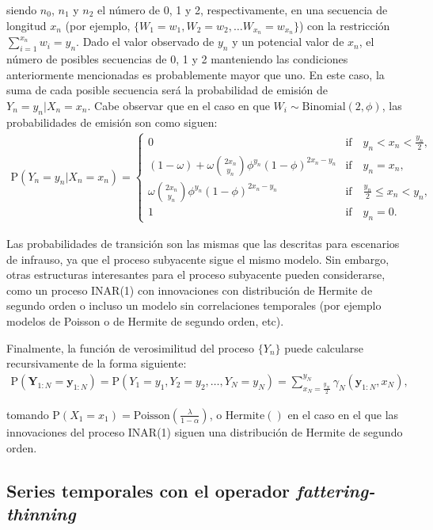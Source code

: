 \documentclass[12pt,twoside]{article} %
\begin{document}
\noindent siendo $n_0$, $n_1$ y $n_2$ el número de 0, 1 y 2, respectivamente, en una secuencia de longitud $x_n$ (por ejemplo, $\{W_1=w_1, W_2=w_2, \dots W_{x_n}=w_{x_n}\}$) con la restricción $\sum_{i=1}^{x_n}w_i=y_n$. Dado el valor observado de $y_n$ y un potencial valor de $x_n$, el número de posibles secuencias de 0, 1 y 2 manteniendo las condiciones anteriormente mencionadas es probablemente mayor que uno. En este caso, la suma de cada posible secuencia será la probabilidad de emisión de $Y_n=y_n|X_n=x_n$. Cabe observar que en el caso en que $W_i \sim \textrm{Binomial}(2,\phi)$, las probabilidades de emisión son como siguen:
 \begin{align}
\textrm{P}(Y_n=y_n|X_n=x_n)=\begin{cases} 
0 &  \textrm{if} \quad y_n<x_n<\frac{y_n}{2} , \\
(1-\omega)+\omega \binom{2x_n}{y_n}\phi^{y_n}(1-\phi)^{2x_n-y_n}&  \textrm{if} \quad y_n=x_n , \\
\omega \binom{2x_n}{y_n}\phi^{y_n}(1-\phi)^{2x_n-y_n} &  \textrm{if} \quad  \frac{y_n}{2}\leq x_n <y_n, \\
1 & \textrm{if} \quad  y_n=0.
\end{cases}
\end{align}

\noindent Las probabilidades de transición son las mismas que las descritas para escenarios de infrauso, ya que el proceso subyacente sigue el mismo modelo. Sin embargo, otras estructuras interesantes para el proceso subyacente pueden considerarse, como un proceso INAR(1) con innovaciones con distribución de Hermite de segundo orden o incluso un modelo sin correlaciones temporales (por ejemplo modelos de Poisson o de Hermite de segundo orden, etc).

\noindent Finalmente, la función de verosimilitud del proceso $\{Y_n\}$ puede calcularse recursivamente de la forma siguiente:
\begin{align}
\label{for:LF}
\textrm{P}(\boldsymbol{Y}_{1:N}=\boldsymbol{y}_{1:N})=\textrm{P}\left(Y_1=y_1,Y_2=y_2,\dots,Y_N=y_N\right)=\sum_{x_N=\frac{y_N}{2}}^{y_N}\gamma_N\left(\boldsymbol{y}_{1:N},x_N\right),
\end{align}

\noindent tomando $\textrm{P}(X_1=x_1)=\textrm{Poisson}(\frac{\lambda}{1-\alpha})$, o $\textrm{Hermite}()$ en el caso en el que las innovaciones del proceso INAR(1) siguen una distribución de Hermite de segundo orden. 

\subsection{Series temporales con el operador \textit{fattering-thinning}}
\end{document}

